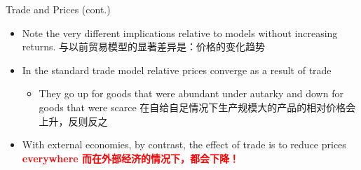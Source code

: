 \documentclass[10pt,hyperref={CJKbookmarks=true},xcolor=dvipsnames,aspectratio=169]{beamer}
\begin{document}
\begin{frame}{Trade and Prices (cont.) }

\begin{itemize}
\item Note the very different implications relative to models without increasing
returns. 与以前贸易模型的显著差异是：价格的变化趋势
\item In the standard trade model relative prices converge as a result of
trade 

\begin{itemize}
\item They go up for goods that were abundant under autarky and down for
goods that were scarce 在自给自足情况下生产规模大的产品的相对价格会上升，反则反之 
\end{itemize}
\item With external economies, by contrast, the effect of trade is to reduce
prices\textbf{\textcolor{red}{{} everywhere 而在外部经济的情况下，都会下降！}}
\end{itemize}
\end{frame}
\end{document}
